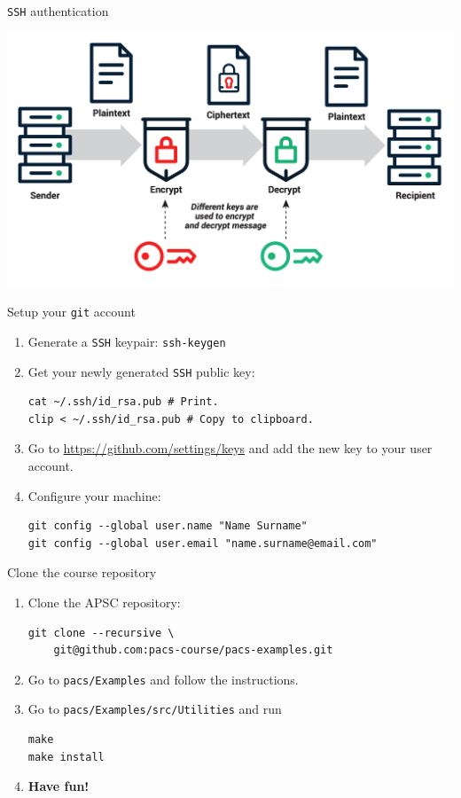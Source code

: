 \documentclass{beamer}
\begin{document}
\begin{frame}{\texttt{SSH} authentication}
    \begin{center}
        \includegraphics[width=\textwidth]{rsa.png}
    \end{center}
\end{frame}

\begin{frame}[fragile]{Setup your \texttt{git} account}
\begin{enumerate}
    \item Generate a \texttt{SSH} keypair: \texttt{ssh-keygen}
    \item Get your newly generated \texttt{SSH} public key:
    \begin{lstlisting}
cat ~/.ssh/id_rsa.pub # Print.
clip < ~/.ssh/id_rsa.pub # Copy to clipboard.
    \end{lstlisting}
    \item Go to \url{https://github.com/settings/keys} and add the new key to your user account.
    \item Configure your machine:
    \begin{lstlisting}
git config --global user.name "Name Surname"
git config --global user.email "name.surname@email.com"
    \end{lstlisting}
\end{enumerate}
\end{frame}

\begin{frame}[fragile]{Clone the course repository}
\begin{enumerate}
    \item Clone the APSC repository:
    \begin{lstlisting}
git clone --recursive \
    git@github.com:pacs-course/pacs-examples.git
    \end{lstlisting}
    \item Go to \texttt{pacs/Examples} and follow the instructions.
    \item Go to \texttt{pacs/Examples/src/Utilities} and run
\begin{lstlisting}
make
make install
\end{lstlisting}
\pause
    \item \textbf{Have fun!}
\end{enumerate}
\end{frame}
\end{document}
